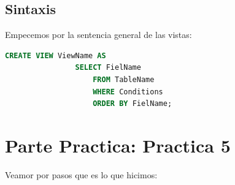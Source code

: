 \documentclass[12pt, fleqn]{article}                             %
\begin{document}
    \subsection{Sintaxis}

        Empecemos por la sentencia general de las vistas:

        \begin{lstlisting}[language=SQL, gobble=12]
            CREATE VIEW ViewName AS
                SELECT FielName
                    FROM TableName
                    WHERE Conditions
                    ORDER BY FielName; 
        \end{lstlisting}






       

\clearpage
\section{Parte Practica: Practica 5}

    Veamor por pasos que es lo que hicimos:
\end{document}
